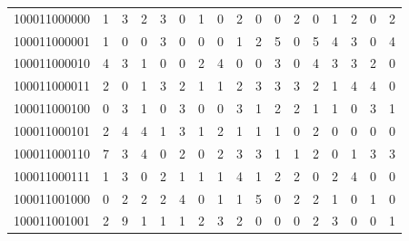 \documentclass[10pt,a4paper]{article}
\begin{document}
\begin{longtable}{ |c|c|c|c|c|c|c|c|c|c|c|c|c|c|c|c|c| }
    100011000000              & 1                            & 3                                & 2                            & 3                              & 0   & 1   & 0   & 2   & 0   & 0   & 2   & 0   & 1   & 2   & 0   & 2   \\
    100011000001              & 1                            & 0                                & 0                            & 3                              & 0   & 0   & 0   & 1   & 2   & 5   & 0   & 5   & 4   & 3   & 0   & 4   \\
    100011000010              & 4                            & 3                                & 1                            & 0                              & 0   & 2   & 4   & 0   & 0   & 3   & 0   & 4   & 3   & 3   & 2   & 0   \\
    100011000011              & 2                            & 0                                & 1                            & 3                              & 2   & 1   & 1   & 2   & 3   & 3   & 3   & 2   & 1   & 4   & 4   & 0   \\
    100011000100              & 0                            & 3                                & 1                            & 0                              & 3   & 0   & 0   & 3   & 1   & 2   & 2   & 1   & 1   & 0   & 3   & 1   \\
    100011000101              & 2                            & 4                                & 4                            & 1                              & 3   & 1   & 2   & 1   & 1   & 1   & 0   & 2   & 0   & 0   & 0   & 0   \\
    100011000110              & 7                            & 3                                & 4                            & 0                              & 2   & 0   & 2   & 3   & 3   & 1   & 1   & 2   & 0   & 1   & 3   & 3   \\
    100011000111              & 1                            & 3                                & 0                            & 2                              & 1   & 1   & 1   & 4   & 1   & 2   & 2   & 0   & 2   & 4   & 0   & 0   \\
    100011001000              & 0                            & 2                                & 2                            & 2                              & 4   & 0   & 1   & 1   & 5   & 0   & 2   & 2   & 1   & 0   & 1   & 0   \\
    100011001001              & 2                            & 9                                & 1                            & 1                              & 1   & 2   & 3   & 2   & 0   & 0   & 0   & 2   & 3   & 0   & 0   & 1   \\

\end{longtable}
\end{document}
